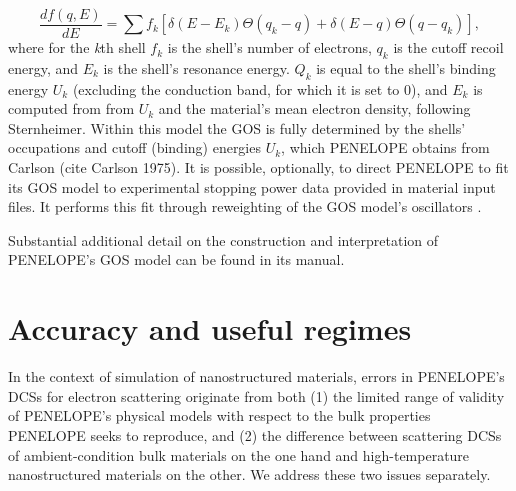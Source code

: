 \documentclass [11pt, proquest, article] {uwthesis}[2016/11/22]
\begin{document}
$$
\frac{df(q, E)}{dE} = \sum f_k [\delta(E - E_k) \Theta (q_k - q) + \delta(E-q) \Theta(q - q_k)],
$$
where for the \emph{k}th shell $f_k$ is the shell's number of electrons, $q_k$ is the cutoff recoil energy, and $E_k$ is the shell's resonance energy. $Q_k$ is equal to the shell's binding energy $U_k$ (excluding the conduction band, for which it is set to 0), and $E_k$ is computed from from $U_k$ and the material's mean electron density, following Sternheimer.\cite{sternheimer1953energy} Within this model the GOS is fully determined by the shells' occupations and cutoff (binding) energies $U_k$, which PENELOPE obtains from Carlson (cite Carlson 1975). It is possible, optionally, to direct PENELOPE to fit its GOS model to experimental stopping power data provided in material input files. It performs this fit through reweighting of the GOS model's oscillators .

Substantial additional detail on the construction and interpretation of PENELOPE's GOS model can be found in its manual.


\section{Accuracy and useful regimes}
In the context of simulation of nanostructured materials, errors in PENELOPE's DCSs for electron scattering originate from both (1) the limited range of validity of PENELOPE's physical models with respect to the bulk properties PENELOPE seeks to reproduce, and (2) the difference between scattering DCSs of ambient-condition bulk materials on the one hand and high-temperature nanostructured materials on the other. We address these two issues separately.
\end{document}
